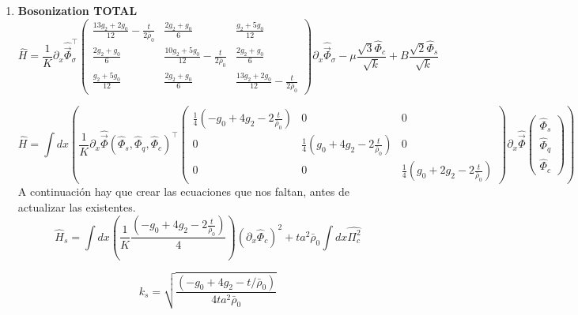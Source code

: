 \begin{enumerate}
    \item \textbf{Bosonization TOTAL }
\begin{equation}
    \hat{H} = \frac{1}{K} \partial_{x}\hat{\vec{\Phi}}_{\sigma}^\top
                    \begin{pmatrix}
                    \frac{13 g_2 + 2 g_0}{12} - \frac{t}{2\bar{\rho}_{0}}   & \frac{2g_2 + g_0}{6} & \frac{g_2+5g_0}{12} \\
                    \frac{2g_2 + g_0}{6} & \frac{10g_2 + 5 g_0}{12} - \frac{t}{2\bar{\rho}_{0}}   & \frac{2g_2 + g_0}{6} \\
                    \frac{g_2+5g_0}{12}& \frac{2g_2 + g_0}{6}& \frac{13 g_2 + 2 g_0}{12} - \frac{t}{2\bar{\rho}_{0}}   
            \end{pmatrix}  \partial_{x}\hat{\vec{\Phi}}_\sigma  -\mu \frac{\sqrt{3} \hat{\Phi}_c}{\sqrt{k}}  + B \frac{\sqrt{2}\hat{\Phi}_s}{\sqrt{k}}
\end{equation}


\begin{equation}
    \hat{H} = \int dx \left( \frac{1}{K} \partial_{x}\hat{\vec{\Phi}} (\hat{\Phi}_{s},\hat{\Phi}_{q},\hat{\Phi}_{c})^\top
                    \begin{pmatrix}
                    \frac{1}{4}\left(-g_{0}+4g_{2} - 2 \frac{t}{\bar{\rho}_{0}}\right)  & 0 & 0 \\
                    0 & \frac{1}{4}\left(g_{0}+4g_{2} - 2 \frac{t}{\bar{\rho}_{0}}\right)  & 0\\
                    0& 0& \frac{1}{4}\left( g_{0}+2g_{2} - 2 \frac{t}{\bar{\rho}_{0}}\right)
                \end{pmatrix}  \partial_{x}\hat{\vec{\Phi}} \begin{pmatrix}
                    \hat{\Phi}_{s} \\
                    \hat{\Phi}_{q} \\
                    \hat{\Phi}_{c}
                \end{pmatrix} \right)
\end{equation}
A continuación hay que crear las ecuaciones que nos faltan, antes de actualizar las existentes.
\begin{equation}
    \hat{H}_{s} = \int dx \left( \frac{1}{K} \frac{(-g_{0}+4g_{2} - 2 \frac{t}{\bar{\rho}_{0}})}{4} \right) (\partial_{x}\hat{\Phi}_c)^{2}    +t a^2 \bar{\rho}_{0} \int dx \hat{\Pi_{c}^{2}}
\end{equation}

\begin{equation}
    k_{s} = \sqrt{\frac{(-g_{0} +4g_{2}-t/\bar{\rho}_{0})}{4ta^2 \bar{\rho}_{0}}}
\end{equation}


\end{enumerate}
